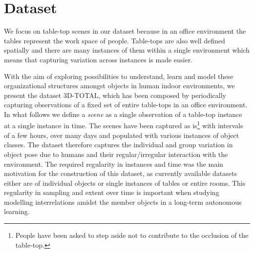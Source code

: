 \documentclass[letterpaper, 10 pt, conference]{ieeeconf}  %
\begin{document}
\section{Dataset}
\label{sec:Dataset}
We focus on table-top scenes in our dataset because in an office environment the tables represent the work space of people. Table-tops are also well defined spatially and there are many instances of them within a single environment which means that capturing variation across instances is made easier.

With the aim of exploring possibilities to understand, learn and model these organizational structures amongst objects in human indoor 
environments, we present the dataset 3D-TOTAL, which has been composed by periodically capturing observations of a fixed set of entire 
table-tops in an office environment. In what follows we define a \textit{scene} as a single observation of a table-top instance at a single 
instance in time. The scenes have been captured as is\footnote{People have been asked to step aside not to contribute to the occlusion of 
the table-top.} with intervals of a few hours, over many days and populated with various instances of object classes. The dataset therefore 
captures the individual and group variation in object pose due to humans and their regular/irregular interaction with the environment. The 
required regularity in instances and time was the main motivation for the construction of this dataset, as currently available datasets 
either are of individual objects or single instances of tables or entire rooms. This regularity in sampling and extent over time is 
important when studying modelling interrelations amidst the member objects in a long-term autonomous learning. 
\end{document}
